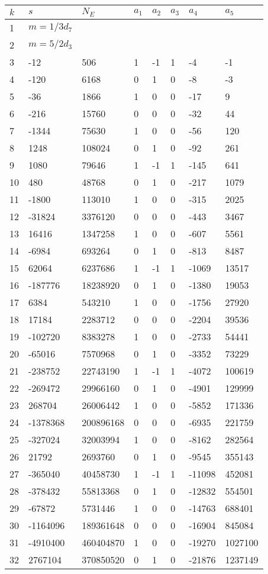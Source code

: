 \documentclass{amsart}
\begin{document}
\begin{longtable}{|l|l|l|lllll|}
\hline
$k$ & $s$ & $N_E$ & $a_1$ & $a_2$ & $a_3$ & $a_4$ & $a_5$\\
\hline
1&$m=1/3d_{7}$&&\multicolumn{5}{c|}{}\\
2&$m=5/2d_{3}$&&\multicolumn{5}{c|}{}\\
3&-12&506&1&-1&1&-4&-1\\
4&-120&6168&0&1&0&-8&-3\\
5&-36&1866&1&0&0&-17&9\\
6&-216&15760&0&0&0&-32&44\\
7&-1344&75630&1&0&0&-56&120\\
8&1248&108024&0&1&0&-92&261\\
9&1080&79646&1&-1&1&-145&641\\
10&480&48768&0&1&0&-217&1079\\
11&-1800&113010&1&0&0&-315&2025\\
12&-31824&3376120&0&0&0&-443&3467\\
13&16416&1347258&1&0&0&-607&5561\\
14&-6984&693264&0&1&0&-813&8487\\
15&62064&6237686&1&-1&1&-1069&13517\\
16&-187776&18238920&0&1&0&-1380&19053\\
17&6384&543210&1&0&0&-1756&27920\\
18&17184&2283712&0&0&0&-2204&39536\\
19&-102720&8383278&1&0&0&-2733&54441\\
20&-65016&7570968&0&1&0&-3352&73229\\
21&-238752&22743190&1&-1&1&-4072&100619\\
22&-269472&29966160&0&1&0&-4901&129999\\
23&268704&26006442&1&0&0&-5852&171336\\
24&-1378368&200896168&0&0&0&-6935&221759\\
25&-327024&32003994&1&0&0&-8162&282564\\
26&21792&2693760&0&1&0&-9545&355143\\
27&-365040&40458730&1&-1&1&-11098&452081\\
28&-378432&55813368&0&1&0&-12832&554501\\
29&-67872&5731446&1&0&0&-14763&688401\\
30&-1164096&189361648&0&0&0&-16904&845084\\
31&-4910400&460404870&1&0&0&-19270&1027100\\
32&2767104&370850520&0&1&0&-21876&1237149\\

\end{longtable}
\end{document}
